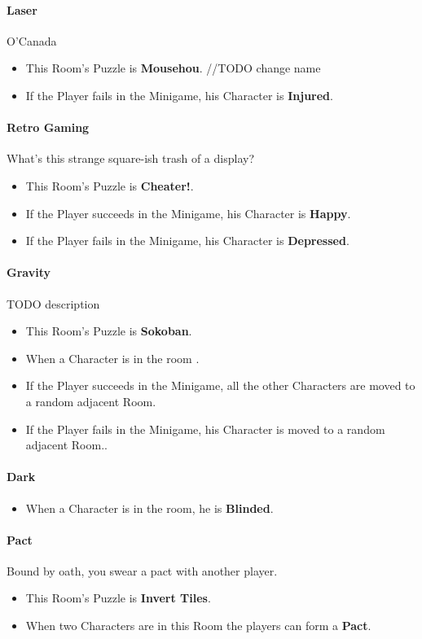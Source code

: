 \paragraph{Laser} O'Canada
\begin{itemize}
	\item This Room's Puzzle is \textbf{Mousehou}. //TODO change name
	\item If the Player fails    in the Minigame, his Character is \textbf{Injured}.
\end{itemize}

\paragraph{Retro Gaming} What's this strange square-ish trash of a display?
\begin{itemize}
	\item This Room's Puzzle is \textbf{Cheater!}.
	\item If the Player succeeds in the Minigame, his Character is \textbf{Happy}.
	\item If the Player fails    in the Minigame, his Character is \textbf{Depressed}.
\end{itemize}

\paragraph{Gravity} TODO description
\begin{itemize}
	\item This Room's Puzzle is \textbf{Sokoban}.
	\item When a Character is in the room .
	\item If the Player succeeds in the Minigame, all the other Characters are moved to a random adjacent Room.
	\item If the Player fails    in the Minigame, his Character is moved to a random adjacent Room..
\end{itemize}

\paragraph{Dark} 
\begin{itemize}
	\item When a Character is in the room, he is \textbf{Blinded}.
\end{itemize}

\paragraph{Pact} Bound by oath, you swear a pact with another player. 
\begin{itemize}
	\item This Room's Puzzle is \textbf{Invert Tiles}.
	\item When two Characters are in this Room the players can form a \textbf{Pact}.
\end{itemize}

